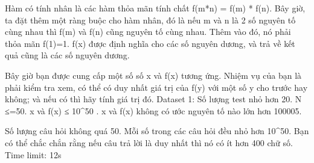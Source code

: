 Hàm có tính nhân là các hàm thỏa mãn tính chất f(m*n) = f(m) * f(n). Bây giờ, ta đặt thêm một ràng buộc cho hàm nhân, đó là nếu m và n là 2 số nguyên tố cùng nhau thì f(m) và f(n) cũng nguyên tố cùng nhau. Thêm vào đó, nó phải thỏa mãn f(1)=1. f(x) được định nghĩa cho các số nguyên dương, và trả về kết quả cũng là các số nguyên dương.  

   Bây giờ bạn được cung cấp một số số x và f(x) tương ứng. Nhiệm vụ của bạn là phải kiểm tra xem, có thể có duy nhất giá trị của f(y) với một số y cho trước hay không; và nếu có thì hãy tính giá trị đó.
Dataset 1: Số lượng test nhỏ hơn 20. N ≤=50. x và f(x) ≤ 10^50 . x và f(x) không có ước nguyên tố nào lớn hơn 100005.  

   Số lượng câu hỏi không quá 50. Mỗi số trong các câu hỏi đều nhỏ hơn 10^50. Bạn có thể chắc chắn rằng nếu câu trả lời là duy nhất thì nó có ít hơn 400 chữ số. Time limit: 12s